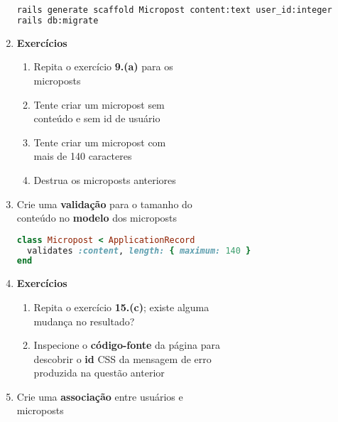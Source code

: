 \documentclass[a4paper,12pt]{article}
\begin{document}
\begin{enumerate}
    \begin{lstlisting}[language=Bash, basicstyle=\fontsize{8.5}{12}\selectfont\ttfamily]
rails generate scaffold Micropost content:text user_id:integer
rails db:migrate
    \end{lstlisting}

  \item \textbf{Exercícios}

    \begin{enumerate}
      \item Repita o exercício \textbf{9.(a)} para os \\
            microposts
      \item Tente criar um micropost sem \\
            conteúdo e sem id de usuário
      \item Tente criar um micropost com \\
            mais de 140 caracteres
      \item Destrua os microposts anteriores
    \end{enumerate}

  \item Crie uma \textbf{validação} para o tamanho do \\
        conteúdo no \textbf{modelo} dos microposts

    \begin{lstlisting}[language=Ruby, title=app/models/micropost.rb]
class Micropost < ApplicationRecord
  validates :content, length: { maximum: 140 }
end
    \end{lstlisting}

  \item \textbf{Exercícios}

    \begin{enumerate}
      \item Repita o exercício \textbf{15.(c)}; existe alguma \\
            mudança no resultado?
      \item Inspecione o \textbf{código-fonte} da página para \\
            descobrir o \textbf{id} CSS da mensagem de erro \\
            produzida na questão anterior
    \end{enumerate}

  \item Crie uma \textbf{associação} entre usuários e \\
        microposts


\end{enumerate}
\end{document}
